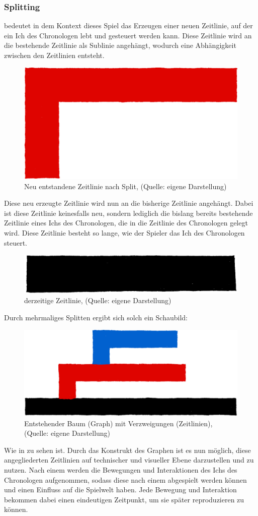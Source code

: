 \subsubsection{Splitting}\label{sec:split}
 bedeutet in dem Kontext dieses Spiel das Erzeugen einer neuen Zeitlinie, auf der ein Ich des Chronologen lebt und gesteuert werden kann. Diese Zeitlinie wird an die bestehende Zeitlinie als Sublinie angehängt, wodurch eine Abhängigkeit zwischen den Zeitlinien entsteht.

\begin{figure}[ht]
\centering
\includegraphics[width=0.2\linewidth]{content/pictures/Split.jpg}
\caption{Neu entstandene Zeitlinie nach Split, (Quelle: eigene Darstellung)}
\label{fig:split}
\end{figure}

Diese neu erzeugte Zeitlinie wird nun an die bisherige Zeitlinie angehängt. Dabei ist diese Zeitlinie keinesfalls neu, sondern lediglich die bislang bereits bestehende Zeitlinie eines Ichs des Chronologen, die in die Zeitlinie des Chronologen gelegt wird. Diese Zeitlinie besteht so lange, wie der Spieler das Ich des Chronologen steuert.
\begin{figure}[ht]
\centering
\includegraphics[width=0.2\linewidth]{content/pictures/Timeline.jpg}
\caption{derzeitige Zeitlinie, (Quelle: eigene Darstellung)}
\label{fig:timeline}
\end{figure}
Durch mehrmaliges Splitten ergibt sich solch ein Schaubild:
\begin{figure}[ht]
\centering
\includegraphics[width=0.5\linewidth]{content/pictures/Merge.jpg}
\caption{Entstehender Baum (Graph) mit Verzweigungen (Zeitlinien), (Quelle: eigene Darstellung)}
\label{fig:graph}
\end{figure}
Wie in  zu sehen ist. Durch das Konstrukt des Graphen ist es nun möglich, diese angegliederten Zeitlinien auf technischer und visueller Ebene darzustellen und zu nutzen.
Nach einem  werden die Bewegungen und Interaktionen des Ichs des Chronologen aufgenommen, sodass diese nach einem  abgespielt werden können und einen Einfluss auf die Spielwelt haben. Jede Bewegung und Interaktion bekommen dabei einen eindeutigen Zeitpunkt, um sie später reproduzieren zu können.

